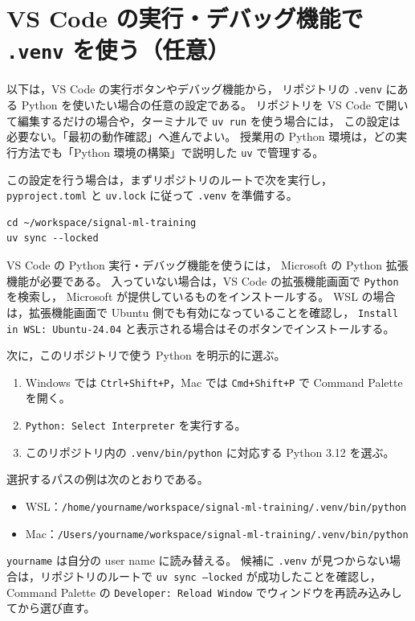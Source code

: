 \section{VS Code の実行・デバッグ機能で \texttt{.venv} を使う（任意）}

以下は，VS Code の実行ボタンやデバッグ機能から，
リポジトリの \texttt{.venv} にある Python を使いたい場合の任意の設定である。
リポジトリを VS Code で開いて編集するだけの場合や，ターミナルで \texttt{uv run} を使う場合には，
この設定は必要ない。「最初の動作確認」へ進んでよい。
授業用の Python 環境は，どの実行方法でも「Python 環境の構築」で説明した \texttt{uv} で管理する。

この設定を行う場合は，まずリポジトリのルートで次を実行し，
\texttt{pyproject.toml} と \texttt{uv.lock} に従って \texttt{.venv} を準備する。

\begin{lstlisting}[style=codecell]
cd ~/workspace/signal-ml-training
uv sync --locked
\end{lstlisting}

VS Code の Python 実行・デバッグ機能を使うには，
Microsoft の Python 拡張機能が必要である。
入っていない場合は，VS Code の拡張機能画面で \texttt{Python} を検索し，
Microsoft が提供しているものをインストールする。
WSL の場合は，拡張機能画面で Ubuntu 側でも有効になっていることを確認し，
\texttt{Install in WSL: Ubuntu-24.04} と表示される場合はそのボタンでインストールする。

次に，このリポジトリで使う Python を明示的に選ぶ。

\begin{enumerate}
\item Windows では \texttt{Ctrl+Shift+P}，Mac では \texttt{Cmd+Shift+P} で Command Palette を開く。

\item \texttt{Python: Select Interpreter} を実行する。

\item このリポジトリ内の \texttt{.venv/bin/python} に対応する Python 3.12 を選ぶ。

\end{enumerate}

選択するパスの例は次のとおりである。
\begin{itemize}
\item WSL：\texttt{/home/yourname/workspace/signal-ml-training/.venv/bin/python}
\item Mac：\texttt{/Users/yourname/workspace/signal-ml-training/.venv/bin/python}
\end{itemize}
\texttt{yourname} は自分の user name に読み替える。
候補に \texttt{.venv} が見つからない場合は，リポジトリのルートで \texttt{uv sync --locked} が成功したことを確認し，
Command Palette の \texttt{Developer: Reload Window} でウィンドウを再読み込みしてから選び直す。

